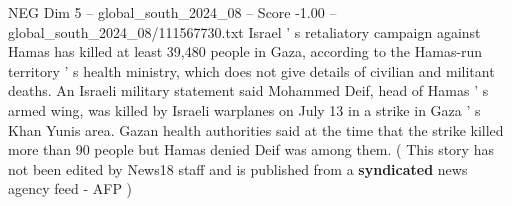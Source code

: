 \begin{textsample}{NEG Dim 5 – global\_south\_2024\_08 – Score -1.00 – global\_south\_2024\_08/111567730.txt}
Israel ' s retaliatory campaign against Hamas has killed at least 39,480 people in Gaza, according to the Hamas-run territory ' s health ministry, which does not give details of civilian and militant deaths.
An Israeli military statement said Mohammed Deif, head of Hamas ' s armed wing, was killed by Israeli warplanes on July 13 in a strike in Gaza ' s Khan Yunis area.
Gazan health authorities said at the time that the strike killed more than 90 people but Hamas denied Deif was among them. ( This story has not been edited by News18 staff and is published from a \textbf{syndicated} news agency feed - AFP )

\end{textsample}
